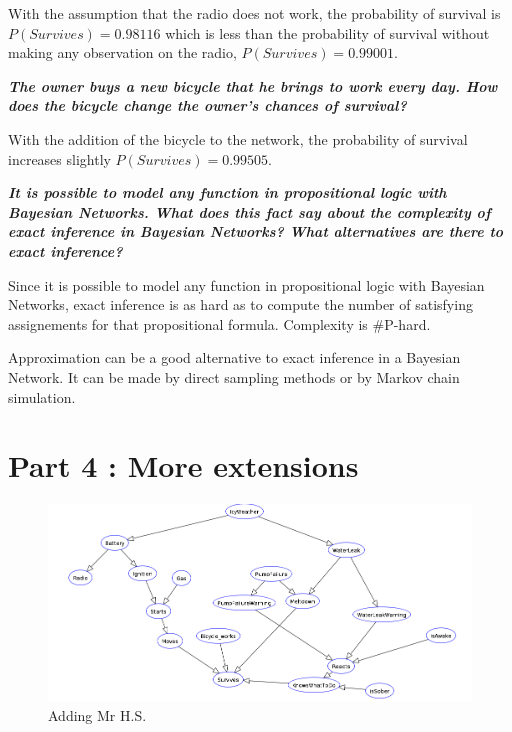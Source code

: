 \vspace{1em}
With the assumption that the radio does not work, the probability of survival
is \textbf{$P(Survives)=0.98116$} which is less than the probability of survival
without making any
observation on the radio, \textbf{$P(Survives)=0.99001$}.

\textit{\textbf{The owner buys a new bicycle that he brings to work every day.
How does the bicycle change the owner's chances of survival?}}

\vspace{1em}
With the addition of the bicycle to the network, the probability of survival
increases slightly $P(Survives)=0.99505$.

\textit{\textbf{It is possible to model any function in propositional
logic with Bayesian Networks. What does this fact say about the complexity
of exact inference in Bayesian Networks? What alternatives are there
to exact inference?}}




Since it is possible to model any function in propositional logic with Bayesian
Networks, exact inference is as hard as to compute the number of satisfying
assignements for that propositional formula. Complexity is \#P-hard.

Approximation can be a good alternative to exact inference in a Bayesian
Network. It can be made by direct sampling methods or by Markov chain
simulation.

\newpage
\thispagestyle{empty}
\section*{Part 4 : More extensions}

\begin{figure}[h]
    \centering
      \includegraphics[width=0.83\linewidth]{./images/lab3.png}
    \caption{Adding Mr H.S.\label{graph}}
\end{figure}

